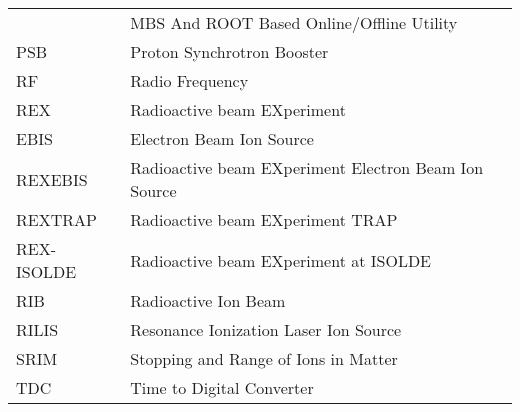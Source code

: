 \begin{tabular}{ll}
                &  MBS And ROOT Based Online/Offline Utility                  \\
    PSB         &  Proton Synchrotron Booster                                 \\
    RF          &  Radio Frequency                                            \\
    REX         &  Radioactive beam EXperiment                                \\
    EBIS        &  Electron Beam Ion Source                                   \\
    REXEBIS     &  Radioactive beam EXperiment Electron Beam Ion Source       \\
    REXTRAP     &  Radioactive beam EXperiment TRAP                           \\
    REX-ISOLDE  &  Radioactive beam EXperiment at ISOLDE                      \\
    RIB         &  Radioactive Ion Beam                                       \\
    RILIS       &  Resonance Ionization Laser Ion Source                      \\
    SRIM        &  Stopping and Range of Ions in Matter                       \\
    TDC         &  Time to Digital Converter                                  \\
    \hline
\end{tabular}